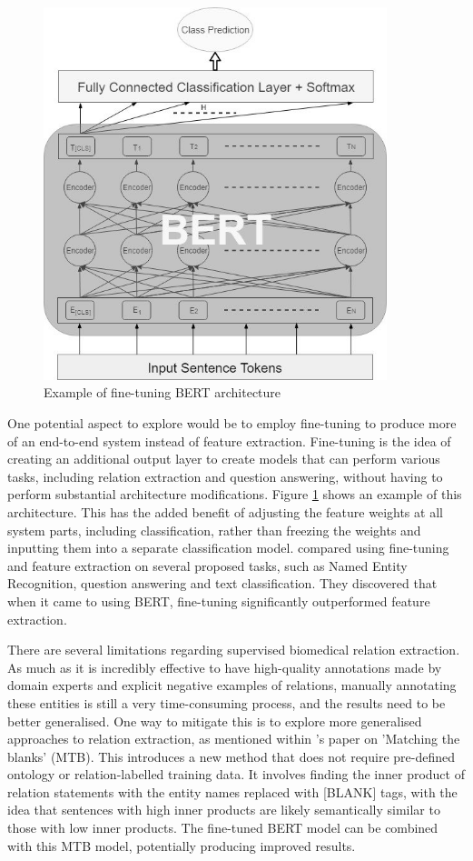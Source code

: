 \documentclass{l4proj}
\begin{document}
 \begin{figure}[htb]
    \centering
    \includegraphics[width=10cm]{images/Fine-tune.jpg}
  \caption{Example of fine-tuning BERT architecture}
  \label{fig:fine}
\end{figure}

One potential aspect to explore would be to employ fine-tuning to produce more of an end-to-end system instead of feature extraction. Fine-tuning is the idea of creating an additional output layer to create models that can perform various tasks, including relation extraction and question answering, without having to perform substantial architecture modifications. Figure \ref{fig:fine} shows an example of this architecture. This has the added benefit of adjusting the feature weights at all system parts, including classification, rather than freezing the weights and inputting them into a separate classification model. \cite{tune} compared using fine-tuning and feature extraction on several proposed tasks, such as Named Entity Recognition, question answering and text classification. They discovered that when it came to using BERT, fine-tuning significantly outperformed feature extraction.

There are several limitations regarding supervised biomedical relation extraction. As much as it is incredibly effective to have high-quality annotations made by domain experts and explicit negative examples of relations, manually annotating these entities is still a very time-consuming process, and the results need to be better generalised. One way to mitigate this is to explore more generalised approaches to relation extraction, as mentioned within \cite{architectures}'s paper on 'Matching the blanks' (MTB). This introduces a new method that does not require pre-defined ontology or relation-labelled training data. It involves finding the inner product of relation statements with the entity names replaced with [BLANK] tags, with the idea that sentences with high inner products are likely semantically similar to those with low inner products. The fine-tuned BERT model can be combined with this MTB model, potentially producing improved results.
\end{document}

